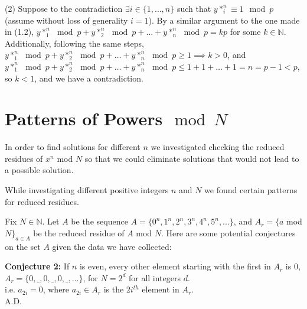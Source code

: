 \documentclass{article}
\begin{document}
\begin{flushleft}
\vspace{.1in}

(2) Suppose to the contradiction $\exists i \in \{1, \ldots, n\}$ such that $y*_i^n \equiv 1 \mod p$ (assume without loss of generality $i = 1$). By a similar argument to the one made in (1.2), $y*_1^n \mod p + y*_2^n \mod p + \ldots + y*_n^n \mod p = kp$ for some $k \in \mathbb{N}$. Additionally, following the same steps, $y*_1^n \mod p + y*_2^n \mod p + \ldots + y*_n^n \mod p \geq 1 \implies k > 0$, and $y*_1^n \mod p + y*_2^n \mod p + \ldots + y*_n^n \mod p \leq 1 + 1 + \ldots + 1 = n = p - 1 < p$, so $k < 1$, and we have a contradiction.

\section{Patterns of Powers$\mod N$}
In order to find solutions for different $n$ we investigated checking the reduced residues of $x^n$ mod $N$ so that we could eliminate solutions that would not lead to a possible solution. 

\vspace{.1in}

While investigating different positive integers $n$ and $N$ we found certain patterns for reduced residues. 

\vspace{.1in}

Fix $N\in\mathbb{N}$. Let $A$ be the sequence $A = \{0^n,1^n,2^n,3^n,4^n,5^n,...\}$, and $A_r = \{a$ mod $N\}_{a\in A}$ be the reduced residue of $A$ mod $N$. Here are some potential conjectures on the set $A$ given the data we have collected:

\vspace{.1in}

{\bf Conjecture 2:} If $n$ is even, every other element starting with the first in $A_r$ is $0$, $A_r=\{0,\_,0,\_,0,\_,...\}$, for $N=2^d$ for all integers $d$. \\
    \hspace{.2in} i.e. $a_{2i}=0$, where $a_{2i}\in A_r$ is the $2i^{th}$ element in $A_r$. \\
    \hspace{4.3in} A.D.


\end{flushleft}
\end{document}

